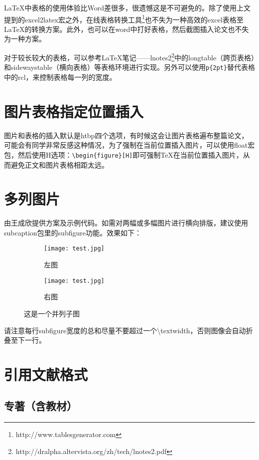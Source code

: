 \LaTeX 中表格的使用体验比Word差很多，很遗憾这是不可避免的。除了使用上文提到的excel2latex宏之外，在线表格转换工具\footnote{http://www.tablesgenerator.com}也不失为一种高效的excel表格至\LaTeX 的转换方案。此外，也可以在word中打好表格，然后截图插入论文也不失为一种方案。

对于较长较大的表格，可以参考\LaTeX 笔记——lnotes2\footnote{\url{}http://dralpha.altervista.org/zh/tech/lnotes2.pdf}中的longtable（跨页表格）和sidewaystable（横向表格）等表格环境进行实现。另外可以使用\verb!p{2pt}!替代表格中的rcl，来控制表格每一列的宽度。

\section{图片表格指定位置插入}

图片和表格的插入默认是htbp四个选项，有时候这会让图片表格遍布整篇论文，可能会有同学非常反感这种情况，为了强制在当前位置插入图片，可以使用float宏包，然后使用H选项：\verb+\begin{figure}[H]+即可强制\TeX 在当前位置插入图片，从而避免正文和图片表格相距太远。

\section{多列图片}
由王成欣提供方案及示例代码。如需对两幅或多幅图片进行横向排版，建议使用subcaption包里的subfigure功能。效果如下：

\begin{figure}[H]
\centering
\begin{subfigure}{.45\textwidth}
  \centering
  \texttt{[image: test.jpg]}
  \caption{左图}
  \label{fig:test_subfigure1}
\end{subfigure}
\begin{subfigure}{.45\textwidth}
  \centering
  \texttt{[image: test.jpg]}
  \caption{右图}
  \label{fig:test_subfigure2}
\end{subfigure}
\caption{这是一个并列子图}
\label{fig:test_subfigure}
\end{figure}

请注意每行subfigure宽度的总和尽量不要超过一个\textbackslash textwidth，否则图像会自动折叠至下一行。

\section{引用文献格式}

\subsection{专著（含教材）}

